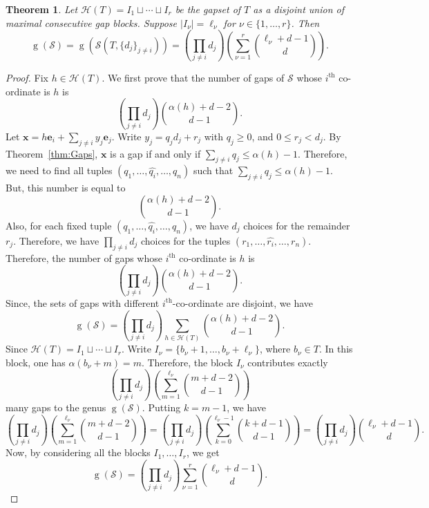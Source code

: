 \documentclass[12pt]{amsart}
\theoremstyle{plain}
\theoremstyle{theorem}
\newtheorem{theorem}[definition]{Theorem}
\theoremstyle{remark}
\begin{document}
\begin{theorem}\label{thm:genus}
	Let $\mathcal{H}(T) = I_1 \sqcup \cdots \sqcup I_r$ be the gapset of $T$ as a disjoint union of maximal consecutive gap blocks. Suppose $|I_{\nu}| = \ell_{\nu}$ for $\nu \in \{1,\ldots, r\}$. Then
	\[ \operatorname{g}(\mathcal{S}) = \operatorname{g}(\mathcal{S}(T,\{d_j\}_{j \neq i})) = \left(\prod_{j\neq i}d_j \right)
	\left( \sum_{\nu =1}^{r}
	\binom{\ell_{\nu}+d-1}{d}\right).\]
\end{theorem}
\begin{proof}
	Fix $h \in \mathcal{H}(T)$. We first prove that the number of gaps of $\mathcal{S}$ whose $i^{\mathrm{th}}$ co-ordinate is $h$ is
	\[
	\left(\prod_{j\neq i}d_j\right)
	\binom{\alpha(h)+d-2}{d-1}.
	\]
	Let $\mathbf{x}=h\mathbf{e}_i+\sum_{j\neq i}y_j\mathbf{e}_j$. Write	$y_j=q_jd_j+r_j$ with $q_j\geq 0$, and $0\leq r_j < d_j$. By Theorem~\ref{thm:Gaps}, $\mathbf{x}$ is a gap if and only if	$\sum_{j\neq i}q_j\leq \alpha(h)-1$. Therefore, we need to find all tuples $(q_1,\ldots,\widehat{q_i},\ldots,q_n)$
	such that $\sum_{j\neq i}q_j\leq \alpha(h)-1$. 	But, this number is equal to
	\[
	\binom{\alpha(h)+d-2}{d-1}.
	\]
	Also, for each fixed tuple $(q_1,\ldots,\widehat{q_i},\ldots,q_n)$, we have $d_j$ choices for the remainder $r_j$. Therefore, we have $\prod_{j\neq i}d_j$ choices for the tuples $(r_1,\ldots,\widehat{r_i},\ldots,r_n)$. Therefore, the number of gaps whose $i^{\mathrm{th}}$ co-ordinate is $h$ is
	\[ \left(\prod_{j\neq i}d_j\right)
	\binom{\alpha(h)+d-2}{d-1}.\]
	Since, the sets of gaps with different $i^{\mathrm{th}}$-co-ordinate are disjoint, we have
	\[\operatorname{g}(\mathcal{S}) = \left(\prod_{j\neq i}d_j \right) \sum_{h\in \mathcal{H}(T)} \binom{\alpha(h)+d-2}{d-1}.	\]
	Since $\mathcal{H}(T)=I_1\sqcup\cdots\sqcup I_r$. Write $I_{\nu}=\{b_{\nu}+1,\ldots,b_{\nu}+\ell_{\nu}\}$, where $b_{\nu}\in T$. In this block, one has $\alpha(b_{\nu}+m)=m$. Therefore, the block $I_{\nu}$ contributes exactly
	\[\left(	\prod_{j\neq i}d_j \right)
	\left( \sum_{m=1}^{\ell_{\nu}} \binom{m+d-2}{d-1} \right) \]
	many gaps to the genus $\operatorname{g}(\mathcal{S})$. 	Putting $k=m-1$, we have
	\[
	\left(\prod_{j\neq i}d_j\right)
	\left(
	\sum_{m=1}^{\ell_{\nu}}
	\binom{m+d-2}{d-1}
	\right)
	=
	\left(\prod_{j\neq i}d_j \right)
	\left(
	\sum_{k=0}^{\ell_{\nu}-1}
	\binom{k+d-1}{d-1}
	\right)
	= \left(\prod_{j\neq i}d_j \right)
	\binom{\ell_{\nu}+d-1}{d}. 	\] Now, by considering all the blocks $I_1,\ldots,I_r$, we get
	\[	\operatorname{g}(\mathcal{S}) = \left(\prod_{j\neq i}d_j \right)
	\sum_{\nu=1}^{r}
	\binom{\ell_{\nu}+d-1}{d}.\]
	
\end{proof}
\end{document}
